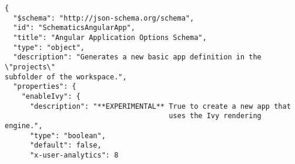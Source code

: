 \begin{verbatim}
{
  "$schema": "http://json-schema.org/schema",
  "id": "SchematicsAngularApp",
  "title": "Angular Application Options Schema",
  "type": "object",
  "description": "Generates a new basic app definition in the \"projects\"
subfolder of the workspace.",
  "properties": {
    "enableIvy": {
      "description": "**EXPERIMENTAL** True to create a new app that
                                       uses the Ivy rendering engine.",
      "type": "boolean",
      "default": false,
      "x-user-analytics": 8
\end{verbatim}
